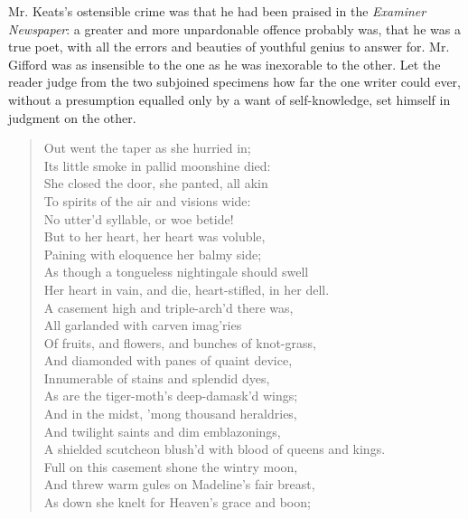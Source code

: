 Mr. Keats's ostensible crime was that he had been praised in the
\emph{Examiner Newspaper}: a greater and more unpardonable offence
probably was, that he was a true poet, with all the errors and
beauties of youthful genius to answer for. Mr. Gifford was as
insensible to the one as he was inexorable to the other. Let the
reader judge from the two subjoined specimens how far the one
writer could ever, without a presumption equalled only by a want
of self-knowledge, set himself in judgment on the other.
\begin{verse}
  Out went the taper as she hurried in;\\
  Its little smoke in pallid moonshine died: \\
  She closed the door, she panted, all akin \\
  To spirits of the air and visions wide: \\
  No utter'd syllable, or woe betide!  \\
  But to her heart, her heart was voluble, \\
  Paining with eloquence her balmy side; \\
  As though a tongueless nightingale should swell \\
  Her heart in vain, and die, heart-stifled, in her dell.\\
\vspace{\stanzaskip}
A casement high and triple-arch'd there was, \\
  All garlanded with carven imag'ries \\
  Of fruits, and flowers, and bunches of knot-grass, \\
  And diamonded with panes of quaint device,\\
  Innumerable of stains and splendid dyes, \\
  As are the tiger-moth's deep-damask'd wings; \\
  And in the midst, 'mong thousand heraldries, \\
  And twilight saints and dim emblazonings, \\
  A shielded scutcheon blush'd with blood of queens and kings.\\
\vspace{\stanzaskip}
  Full on this casement shone the wintry moon, \\
  And threw warm gules on Madeline's fair breast, \\
  As down she knelt for Heaven's grace and boon; \\

\end{verse}
